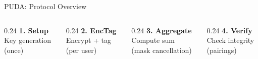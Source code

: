 \documentclass[aspectratio=169,10pt]{beamer}
\begin{document}
\begin{frame}[fragile]{PUDA: Protocol Overview}
    \begin{columns}[T]
        \begin{column}{0.24\textwidth}
            \centering\small
            \textcolor{secondary}{\textbf{1. Setup}}\\
            Key generation\\
            {\tiny (once)}
        \end{column}
        \begin{column}{0.24\textwidth}
            \centering\small
            \textcolor{primary}{\textbf{2. EncTag}}\\
            Encrypt + tag\\
            {\tiny (per user)}
        \end{column}
        \begin{column}{0.24\textwidth}
            \centering\small
            \textcolor{warning}{\textbf{3. Aggregate}}\\
            Compute sum\\
            {\tiny (mask cancellation)}
        \end{column}
        \begin{column}{0.24\textwidth}
            \centering\small
            \textcolor{success}{\textbf{4. Verify}}\\
            Check integrity\\
            {\tiny (pairings)}
        \end{column}
    \end{columns}
\end{frame}
\end{document}

